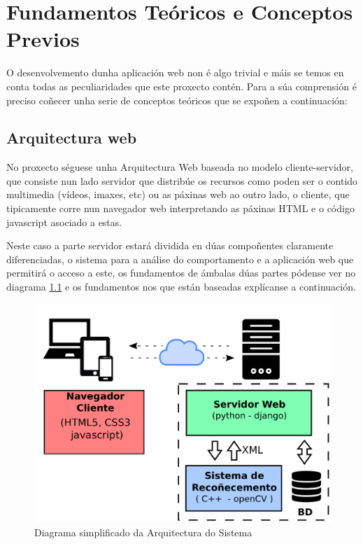 \chapter{Fundamentos Teóricos e Conceptos Previos}

O desenvolvemento dunha aplicación web non é algo trivial e máis se temos en conta todas
as peculiaridades que este proxecto contén. Para a súa comprensión é preciso coñecer unha
serie de conceptos teóricos que se expoñen a continuación:

\section{Arquitectura web}
	No proxecto séguese unha Arquitectura Web baseada no modelo cliente-servidor, que 
	consiste nun lado servidor que distribúe os recursos como poden ser o contido multimedia
	(vídeos, imaxes, etc) ou as páxinas web ao outro lado, o cliente, que tipicamente corre 
	nun navegador web interpretando as páxinas HTML e o código javascript asociado a estas.
	
	Neste caso a parte servidor estará dividida en dúas compoñentes claramente diferenciadas,
	o sistema para a análise do comportamento e a aplicación web que permitirá o acceso a este, 
	os fundamentos de ámbalas dúas partes pódense ver no diagrama 
	\ref{fig:ArqSistemaSimplificado} e os fundamentos nos que están baseadas explícanse a 
	continuación.
	
    \begin{figure}[htp]
    \begin{center}
        \includegraphics[scale=0.45]{figures/ArqSistemaSimplificado.pdf}
        \caption{Diagrama simplificado da Arquitectura do Sistema}
    \label{fig:ArqSistemaSimplificado}
    \end{center}
    \end{figure}
	
